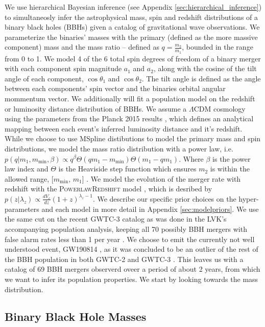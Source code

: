 We use hierarchical Bayesian inference (see Appendix \ref{sec:hierarchical_inference}) to simultaneosly infer the astrophysical mass, spin and redshift distributions of 
a binary black holes (BBHs) given a catalog of gravitational wave observations. We parameterize the binaries' masses with the primary (defined as the more massive component) mass 
and the mass ratio -- defined as $q=\frac{m_2}{m_1}$, bounded in the range from 0 to 1. We model 4 of the 6 total 
spin degrees of freedom of a binary merger with each component spin magnitude $a_1$ and $a_2$, along with the cosine of the tilt angle of each component, 
$\cos{\theta_1}$ and $\cos{\theta_2}$. The tilt angle is defined as the angle between each components' spin vector and the binaries orbital angular mommentum vector. 
We additionally will fit a population model on the redshift or luminosity distance distribution of BBHs. We assume a $\Lambda\mathrm{CDM}$ cosmology using the 
parameters from the Planck 2015 results \cite{Planck2015}, which defines an analytical mapping between each event's inferred
luminosity distance and it's redshift. While we choose to use MSpline distibutions to model the primary mass and spin distributions, we 
model the mass ratio distribution with a power law, i.e. $p(q | m_1, m_\mathrm{min}, \beta) \propto q^{\beta} \Theta(qm_1 - m_\mathrm{min}) \Theta(m_1 - qm_1)$. 
Where $\beta$ is the power law index and $\Theta$ is the Heaviside step function which ensures $m_2$ is within the allowed range, [$m_\mathrm{min}$, $m_1$] \cite{Talbot_2019,o1o2_pop,o3a_pop}.
We model the evolution of the merger rate with redshift with the \textsc{PowerlawRedshift} model \cite{Fishbach_2018redshift}, which is desribed by 
$p(z|\lambda_z)\propto \frac{dV_c}{dz}(1+z)^{\lambda_z-1}$. We describe our specific prior choices on the hyper-parameters and each model 
in more detail in Appendix \ref{sec:modelpriors}. We use the same cut on the recent GWTC-3 catalog as was done in the LVK's accompanying population analysis, 
keeping all 70 possibly BBH mergers with false alarm rates less than 1 per year \cite{GWTC3,o3b_astro_dist}. We choose to emit the currently not well understood event, 
GW190814 \cite{190814disc}, as it was concluded to be an outlier of the rest of the BBH population in both GWTC-2 and GWTC-3 \cite{o3a_pop,o3b_astro_dist,Essick_2022}. 
This leaves us with a catalog of 69 BBH mergers observerd oveer a period of about 2 years, from which we want to infer its population properties. 
We start by looking towards the mass distribution.

\subsection{Binary Black Hole Masses} \label{sec:mass_dist}

